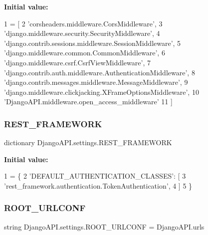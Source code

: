 {\bfseries Initial value\+:}
\begin{DoxyCode}
1 =  [
2     \textcolor{stringliteral}{'corsheaders.middleware.CorsMiddleware'},
3     \textcolor{stringliteral}{'django.middleware.security.SecurityMiddleware'},
4     \textcolor{stringliteral}{'django.contrib.sessions.middleware.SessionMiddleware'},
5     \textcolor{stringliteral}{'django.middleware.common.CommonMiddleware'},
6     \textcolor{stringliteral}{'django.middleware.csrf.CsrfViewMiddleware'},
7     \textcolor{stringliteral}{'django.contrib.auth.middleware.AuthenticationMiddleware'},
8     \textcolor{stringliteral}{'django.contrib.messages.middleware.MessageMiddleware'},
9     \textcolor{stringliteral}{'django.middleware.clickjacking.XFrameOptionsMiddleware'},
10     \textcolor{stringliteral}{'DjangoAPI.middleware.open\_access\_middleware'}
11 ]
\end{DoxyCode}
\mbox{\label{namespace_django_a_p_i_1_1settings_a5bcc9686175dbcb797f53acd54124eef}} 
\subsubsection{\texorpdfstring{R\+E\+S\+T\+\_\+\+F\+R\+A\+M\+E\+W\+O\+RK}{REST\_FRAMEWORK}}
{\footnotesize\ttfamily dictionary Django\+A\+P\+I.\+settings.\+R\+E\+S\+T\+\_\+\+F\+R\+A\+M\+E\+W\+O\+RK}

{\bfseries Initial value\+:}
\begin{DoxyCode}
1 =  \{
2     \textcolor{stringliteral}{'DEFAULT\_AUTHENTICATION\_CLASSES'}: [
3         \textcolor{stringliteral}{'rest\_framework.authentication.TokenAuthentication'},
4     ]
5 \}
\end{DoxyCode}
\mbox{\label{namespace_django_a_p_i_1_1settings_a0ba1c25901d8fcee1127fa0fadccf437}} 
\subsubsection{\texorpdfstring{R\+O\+O\+T\+\_\+\+U\+R\+L\+C\+O\+NF}{ROOT\_URLCONF}}
{\footnotesize\ttfamily string Django\+A\+P\+I.\+settings.\+R\+O\+O\+T\+\_\+\+U\+R\+L\+C\+O\+NF = \textquotesingle{}Django\+A\+P\+I.\+urls\textquotesingle{}}

